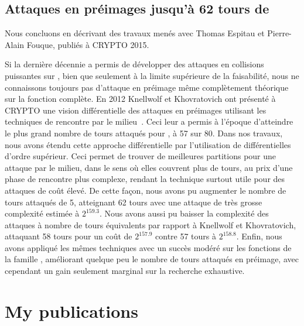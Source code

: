 \subsection{Attaques en préimages jusqu'à 62 tours de \shaone \cite{DBLP:conf/crypto/EspitauFK15}}

Nous concluons en décrivant des travaux menés avec Thomas Espitau et Pierre-Alain Fouque, publiés à CRYPTO 2015.

\medskip

Si la dernière décennie a permis de développer des attaques en collisions puissantes sur \shaone, bien que seulement à la limite supérieure de la faisabilité, nous ne connaissons toujours
pas d'attaque en préimage même complètement théorique sur la fonction complète.
En 2012 Knellwolf et Khovratovich ont présenté à CRYPTO une vision différentielle des attaques en préimages utilisant les techniques de rencontre par le milieu~\cite{DBLP:conf/crypto/KnellwolfK12}.
Ceci leur a permis à l'époque d'atteindre le plus grand nombre de tours attaqués pour \shaone, à 57 sur 80.
Dans nos travaux, nous avons étendu cette approche différentielle par l'utilisation de différentielles d'ordre supérieur. Ceci permet de trouver de meilleures partitions pour une attaque par
le milieu, dans le sens où elles couvrent plus de tours, au prix d'une phase de rencontre plus complexe, rendant la technique surtout utile pour des attaques de coût élevé. De cette façon,
nous avons pu augmenter le nombre de tours attaqués de 5, atteignant 62 tours avec une attaque de très grosse complexité estimée à $2^{159.3}$.
Nous avons aussi pu baisser la complexité des attaques à nombre
de tours équivalents par rapport à Knellwolf et Khovratovich, attaquant 58 tours pour un coût de $2^{157.9}$ contre 57 tours à $2^{158.8}$. Enfin, nous avons appliqué les mêmes
techniques avec un succès modéré sur les fonctions de la famille \blake, améliorant quelque peu le nombre de tours attaqués en préimage, avec cependant un gain seulement
marginal sur la recherche exhaustive.


\newcommand{\mybibtitle}[1]{\textsf{#1.}\hfil}
\newcommand{\mybibauth}[1]{#1.}
\newcommand{\mybibconf}[1]{\hspace*{\stretch{1}}\mbox{(#1)}}

\setcounter{section}{0}
\renewcommand\thesection{\Alph{section}}
\newpage
\section[Mes publications]{My publications}

